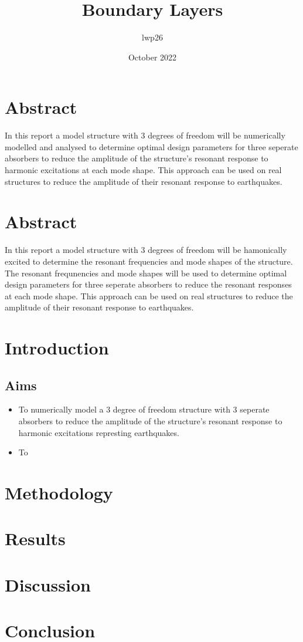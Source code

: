 \documentclass{article}
\begin{document}
\title{Boundary Layers}
\author{lwp26 }
\date{October 2022}
\maketitle

\section{Abstract}
In this report a model structure with 3 degrees of freedom will be numerically modelled and analysed to determine optimal design parameters
for three seperate absorbers to reduce the amplitude of the structure's resonant response to harmonic excitations at each mode shape.
This approach can be used on real structures to reduce the amplitude of their resonant response to earthquakes.

\section{Abstract}
In this report a model structure with 3 degrees of freedom will be hamonically excited to determine the resonant frequencies and mode shapes of the structure.
The resonant frequnencies and mode shapes will be used to determine optimal design parameters for three seperate absorbers to reduce the resonant responses at each mode shape.
This approach can be used on real structures to reduce the amplitude of their resonant response to earthquakes.

\section{Introduction}


\subsection{Aims}

\begin{itemize}
\item To numerically model a 3 degree of freedom structure with 3 seperate absorbers to reduce the amplitude of the structure's resonant response to harmonic excitations represting earthquakes.
\item To
\end{itemize}

\section{Methodology}


\section{Results}

\section{Discussion}


\section{Conclusion}
\end{document}
